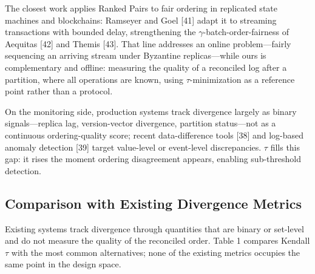 \documentclass[journal]{IEEEtran}
\begin{document}
The closest work applies Ranked Pairs to fair ordering in replicated state machines and blockchains: Ramseyer and Goel [41] adapt it to streaming transactions with bounded delay, strengthening the $\gamma$-batch-order-fairness of Aequitas [42] and Themis [43]. That line addresses an online problem—fairly sequencing an arriving stream under Byzantine replicas—while ours is complementary and offline: measuring the quality of a reconciled log after a partition, where all operations are known, using $\tau$-minimization as a reference point rather than a protocol.

On the monitoring side, production systems track divergence largely as binary signals—replica lag, version-vector divergence, partition status—not as a continuous ordering-quality score; recent data-difference tools [38] and log-based anomaly detection [39] target value-level or event-level discrepancies. $\tau$ fills this gap: it rises the moment ordering disagreement appears, enabling sub-threshold detection.

\subsection{Comparison with Existing Divergence Metrics}
Existing systems track divergence through quantities that are binary or set-level and do not measure the quality of the reconciled order. Table 1 compares Kendall $\tau$ with the most common alternatives; none of the existing metrics occupies the same point in the design space.
\end{document}
